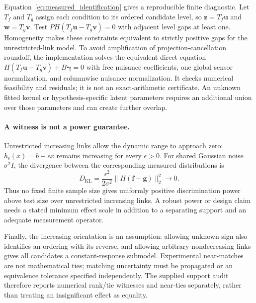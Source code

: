 Equation~\ref{eq:measured_identification} gives a reproducible finite diagnostic.
Let $T_f$ and $T_g$ assign each condition to its ordered candidate level, so
$\mathbf z=T_f\mathbf u$ and $\mathbf w=T_g\mathbf v$. Test
$PH(T_f\mathbf u-T_g\mathbf v)=0$ with adjacent level gaps at least one.
Homogeneity makes these constraints equivalent to strictly positive gaps for
the unrestricted-link model. To avoid amplification of projection-cancellation
roundoff, the implementation solves the equivalent direct equation
$H(T_f\mathbf u-T_g\mathbf v)+B\boldsymbol\gamma=0$ with free nuisance
coefficients, one global sensor normalization, and columnwise nuisance
normalization. It checks numerical feasibility and residuals; it is not an exact-arithmetic
certificate. An unknown fitted kernel or hypothesis-specific latent parameters
requires an additional union over those parameters and can create further
overlap.

\paragraph{A witness is not a power guarantee.}
Unrestricted increasing links allow the dynamic range to approach zero:
$h_\epsilon(x)=b+\epsilon x$ remains increasing for every $\epsilon>0$.
For shared Gaussian noise $\sigma^2 I$, the divergence between the corresponding
measured distributions is
\begin{equation}
D_{\mathrm{KL}}=
\frac{\epsilon^2}{2\sigma^2}\|H(\mathbf f-\mathbf g)\|_2^2
\longrightarrow0.
\end{equation}
Thus no fixed finite sample size gives uniformly positive discrimination power
above test size over unrestricted increasing links. A robust power or design
claim needs a stated minimum effect scale in addition to a separating support
and an adequate measurement operator.

Finally, the increasing orientation is an assumption: allowing unknown sign
also identifies an ordering with its reverse, and allowing arbitrary
nondecreasing links gives all candidates a constant-response submodel.
Experimental near-matches are not mathematical ties; matching uncertainty must
be propagated or an equivalence tolerance specified independently.
The supplied support audit therefore reports numerical rank/tie witnesses and
near-ties separately, rather than treating an insignificant effect as equality.

